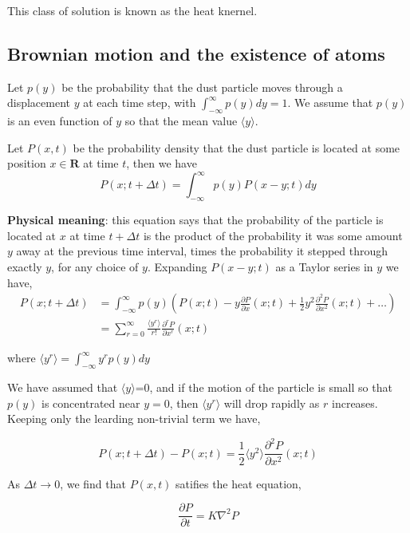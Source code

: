 \documentclass{article}
\theoremstyle{definition}
\begin{document}
This class of solution is known as the heat knernel.





\subsection{Brownian motion and the existence of atoms}

Let $p(y)$ be the probability that the dust particle moves through a displacement $y$ at each time step, with $\int_{-\infty}^{\infty} p(y)dy=1$. We assume that $p(y)$ is an even function of $y$ so that the mean value $\langle y \rangle$.

Let $P(x,t)$ be the probability density that the dust particle is located at some position $x \in \mathbf{R}$ at time $t$, then we have
\begin{equation}
P(x;t+\Delta t)=\int_{-\infty}^{\infty}p(y)P(x-y;t)dy
\end{equation}


\textbf{Physical meaning}: this equation says that the probability of the particle is located at $x$ at time $t+\Delta t$ is the product of the probability it was some amount $y$ away at the previous time interval, times the probability it stepped through exactly $y$, for any choice of $y$. Expanding $P(x-y;t)$ as a Taylor series in $y$ we have,
\begin{align}
P(x;t+\Delta t)&=\int_{-\infty}^{\infty}p(y)(P(x;t)-y\frac{\partial P}{\partial x}(x;t)+\frac{1}{2}y^2\frac{\partial ^2 P}{\partial x^2}(x;t)+\ldots)\\
			   &=\sum_{r=0}^{\infty} \frac{\langle y^r \rangle}{r!} \frac{\partial^r P}{\partial x^r}(x;t)
\end{align}


where $\langle y^r \rangle =\int_{-\infty}^{\infty}y^rp(y)dy$

We have assumed that $\langle y \rangle$=0, and if the motion of the particle is small so that $p(y)$ is concentrated near $y=0$, then $\langle y^r \rangle$  will drop rapidly as $r$ increases. Keeping only the learding non-trivial term we have,

\begin{equation}
P(x;t+\Delta t)-P(x;t)=\frac{1}{2}\langle y^2 \rangle \frac{\partial^2 P}{\partial x^2}(x;t)
\end{equation}

As $\Delta t \to 0$, we find that $P(x,t)$ satifies the heat equation,

\begin{equation}
\frac{\partial P}{\partial t}=K\nabla^2 P
\end{equation}
\end{document}
